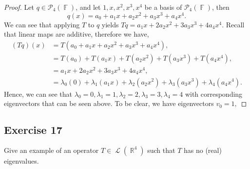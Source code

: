 \documentclass[letterpaper, 12pt]{amsart}
\DeclareMathOperator{\R}{\mathbb{R}}				%
\DeclareMathOperator{\F}{\mathbb{F}}				%
\DeclareMathOperator{\Ell}{\mathscr{L}}				%
\theoremstyle{definition}  							%
\begin{document}
		\begin{proof}
		Let $q \in \mathcal{P}_{4}(\F)$, and let $1,x,x^2,x^3,x^4$ be a basis of $\mathcal{P}_{4}(\F)$, then $$q(x) = a_{0} + a_{1}x + a_{2}x^{2} + a_{3}x^{3} + a_{4}x^{4}.$$ We can see that applying $T$ to $q$ yields $Tq = a_{1}x + 2a_{2}x^{2} + 3a_{3}x^{3} + 4a_{4}x^{4}$.
		Recall that linear maps are additive, therefore we have,
			\begin{align*}
				(Tq)(x) &= T(a_{0} + a_{1}x + a_{2}x^{2} + a_{3}x^{3} + a_{4}x^{4}), \\
				&= T(a_{0}) + T(a_{1}x) + T(a_{2}x^{2}) + T(a_{3}x^{3}) + T(a_{4}x^{4}), \\
				&= a_{1}x + 2a_{2}x^{2} + 3a_{3}x^{3} + 4a_{4}x^{4}, \\
				&= \lambda_{0}\left( 0 \right) + \lambda_{1}\left( a_{1}x \right) + \lambda_{2}\left( a_{2}x^{2} \right) + \lambda_{3}\left( a_{3}x^{3} \right) + \lambda_{4}\left( a_{4}x^{4} \right).
			\end{align*}
		Hence, we can see that $\lambda_{0} = 0, \lambda_{1} = 1, \lambda_{2} = 2, \lambda_{3} = 3, \lambda_{4} = 4$ with corresponding eigenvectors that can be seen above.
		To be clear, we have eigenvectors $v_{0} = 1, $
		\end{proof}

		\subsection*{Exercise 17}
		Give an example of an operator $T \in \Ell \left( \R^{4} \right)$ such that $T$ has no (real) eigenvalues.
\end{document}
